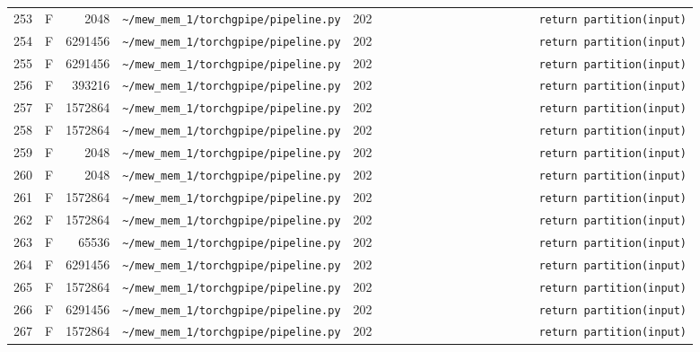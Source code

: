 \documentclass{article}
\begin{document}
\begin{longtable}{r l r p{6.5cm} r p{7.0cm}}
253 & F & 2048 & \lstinline|~/mew_mem_1/torchgpipe/pipeline.py| & 202 & \lstinline|                        return partition(input)| \\
254 & F & 6291456 & \lstinline|~/mew_mem_1/torchgpipe/pipeline.py| & 202 & \lstinline|                        return partition(input)| \\
255 & F & 6291456 & \lstinline|~/mew_mem_1/torchgpipe/pipeline.py| & 202 & \lstinline|                        return partition(input)| \\
256 & F & 393216 & \lstinline|~/mew_mem_1/torchgpipe/pipeline.py| & 202 & \lstinline|                        return partition(input)| \\
257 & F & 1572864 & \lstinline|~/mew_mem_1/torchgpipe/pipeline.py| & 202 & \lstinline|                        return partition(input)| \\
258 & F & 1572864 & \lstinline|~/mew_mem_1/torchgpipe/pipeline.py| & 202 & \lstinline|                        return partition(input)| \\
259 & F & 2048 & \lstinline|~/mew_mem_1/torchgpipe/pipeline.py| & 202 & \lstinline|                        return partition(input)| \\
260 & F & 2048 & \lstinline|~/mew_mem_1/torchgpipe/pipeline.py| & 202 & \lstinline|                        return partition(input)| \\
261 & F & 1572864 & \lstinline|~/mew_mem_1/torchgpipe/pipeline.py| & 202 & \lstinline|                        return partition(input)| \\
262 & F & 1572864 & \lstinline|~/mew_mem_1/torchgpipe/pipeline.py| & 202 & \lstinline|                        return partition(input)| \\
263 & F & 65536 & \lstinline|~/mew_mem_1/torchgpipe/pipeline.py| & 202 & \lstinline|                        return partition(input)| \\
264 & F & 6291456 & \lstinline|~/mew_mem_1/torchgpipe/pipeline.py| & 202 & \lstinline|                        return partition(input)| \\
265 & F & 1572864 & \lstinline|~/mew_mem_1/torchgpipe/pipeline.py| & 202 & \lstinline|                        return partition(input)| \\
266 & F & 6291456 & \lstinline|~/mew_mem_1/torchgpipe/pipeline.py| & 202 & \lstinline|                        return partition(input)| \\
267 & F & 1572864 & \lstinline|~/mew_mem_1/torchgpipe/pipeline.py| & 202 & \lstinline|                        return partition(input)| \\

\end{longtable}
\end{document}
